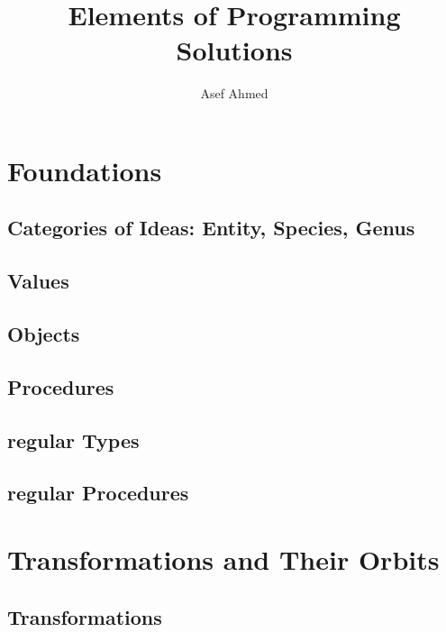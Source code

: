 





\title{Elements of Programming Solutions}

\author{Asef Ahmed}



\maketitle

\section{Foundations}

\subsection{Categories of Ideas: Entity, Species, Genus}

\subsection{Values}


\subsection{Objects}

\subsection{Procedures}

\subsection{regular Types}


\subsection{regular Procedures}


\section{Transformations and Their Orbits}

\subsection{Transformations}

    

